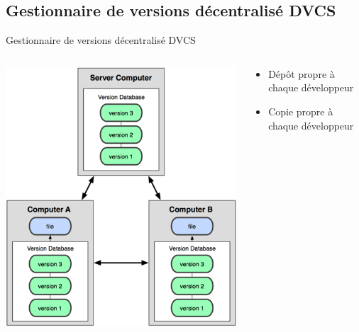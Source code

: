 \subsection{Gestionnaire de versions décentralisé DVCS}
\begin{frame}{Gestionnaire de versions décentralisé DVCS}
  \begin{columns}[T]

    \begin{column}{.6\textwidth}
      \includegraphics[width=\textwidth]{./DVCS.png}
    \end{column}

    \begin{column}{.4\textwidth}
      \begin{itemize}
        \item{Dépôt propre à chaque développeur}
        \item{Copie propre à chaque développeur}
      \end{itemize}
    \end{column}

  \end{columns}
\end{frame}

